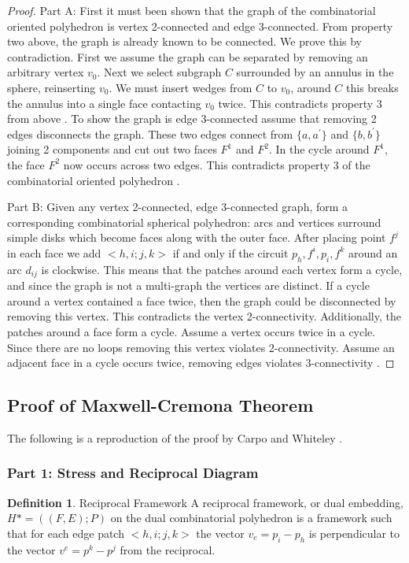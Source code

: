 \documentclass[11pt]{article}
\theoremstyle{definition}
\newtheorem{definition}{Definition}[section]
\begin{document}
	\begin{proof}
		Part A: First it must been shown that the graph of the combinatorial oriented polyhedron is vertex 2-connected and edge 3-connected. 
		From property two above, the graph is already known to be connected. 
		We prove this by contradiction.
		First we assume the graph can be separated by removing an arbitrary vertex $v_0$. 
		Next we select subgraph $C$ surrounded by an annulus in the sphere, reinserting $v_0$. 
		We must insert wedges from $C$ to $v_0$, around $C$ this breaks the annulus into a single face contacting $v_0$ twice. 
		This contradicts property 3 from above \cite{mccProof}.
		To show the graph is edge 3-connected assume that removing 2 edges disconnects the graph. 
		These two edges connect from $\{a,a^{'}\}$ and $\{b, b^{'}\}$ joining 2 components and cut out two faces $F^1$ and $F^2$. 
		In the cycle around $F^1$, the face $F^2$ now occurs across two edges. 
		This contradicts property 3 of the combinatorial oriented polyhedron \cite{mccProof}.

		Part B:
		Given any vertex 2-connected, edge 3-connected graph, form a corresponding combinatorial spherical polyhedron: arcs and vertices surround simple disks which become faces along with the outer face. 
		After placing point $f^j$ in each face we add $<h,i;j,k>$ if and only if the circuit $p_h, f^i,p_i,f^k$ around an arc $d_{ij}$ is clockwise. 
		This means that the patches around each vertex form a cycle, and since the graph is not a multi-graph the vertices are distinct. 
		If a cycle around a vertex contained a face twice, then the graph could be disconnected by removing this vertex. 
		This contradicts the vertex 2-connectivity. 
		Additionally, the patches around a face form a cycle. 
		Assume a vertex occurs twice in a cycle. 
		Since there are no loops removing this vertex violates 2-connectivity. 
		Assume an adjacent face in a cycle occurs twice, removing edges violates 3-connectivity \cite{mccProof}.
	\end{proof}
	
\subsection{Proof of Maxwell-Cremona Theorem}
	The following is a reproduction of the proof by Carpo and Whiteley \cite{mccProof}.
\subsubsection{Part 1: Stress and Reciprocal Diagram}
	\theoremstyle{definition}
	\begin{definition}{Reciprocal Framework}
		A reciprocal framework, or dual embedding, $H* = ((F,E);P)$ on the dual combinatorial polyhedron is a framework such that for each edge patch $<h,i;j,k>$  the vector $v_e = p_i - p_h$ is perpendicular to the vector $v^e = p^k - p^j$ from the reciprocal. 
	\end{definition}
	
\end{document}
